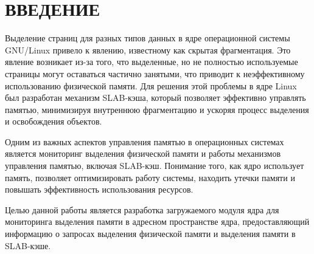 \section*{ВВЕДЕНИЕ}

Выделение страниц для разных типов данных в ядре операционной системы GNU/Linux привело к явлению, известному как скрытая фрагментация.
Это явление возникает из-за того, что выделенные, но не полностью используемые страницы могут оставаться частично занятыми, что приводит к неэффективному использованию физической памяти.
Для решения этой проблемы в ядре Linux был разработан механизм SLAB-кэша, который позволяет эффективно управлять памятью, минимизируя внутреннюю фрагментацию и ускоряя процесс выделения и освобождения объектов.

Одним из важных аспектов управления памятью в операционных системах является мониторинг выделения физической памяти и работы механизмов управления памятью, включая SLAB-кэш.
Понимание того, как ядро использует память, позволяет оптимизировать работу системы, находить утечки памяти и повышать эффективность использования ресурсов.

Целью данной работы является разработка загружаемого модуля ядра для мониторинга выделения памяти в адресном пространстве ядра, предоставляющий информацию о запросах выделения физической памяти и выделения памяти в SLAB-кэше.

%
%
